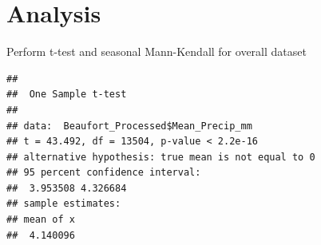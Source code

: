 \documentclass[
  12pt,
]{article}
\newenvironment{Shaded}{\begin{snugshade}}{\end{snugshade}}
\newcommand{\FunctionTok}[1]{\textcolor[rgb]{0.00,0.00,0.00}{#1}}
\newcommand{\NormalTok}[1]{#1}
\newcommand{\SpecialCharTok}[1]{\textcolor[rgb]{0.00,0.00,0.00}{#1}}
\begin{document}
\newpage

\hypertarget{analysis}{%
\section{Analysis}\label{analysis}}

Perform t-test and seasonal Mann-Kendall for overall dataset

\begin{Shaded}
\end{Shaded}

\begin{verbatim}
## 
##  One Sample t-test
## 
## data:  Beaufort_Processed$Mean_Precip_mm
## t = 43.492, df = 13504, p-value < 2.2e-16
## alternative hypothesis: true mean is not equal to 0
## 95 percent confidence interval:
##  3.953508 4.326684
## sample estimates:
## mean of x 
##  4.140096
\end{verbatim}
\end{document}

